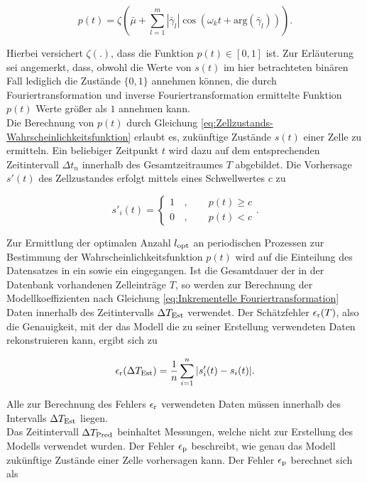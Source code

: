 \begin{equation}\label{eq:Zellzustands-Wahrscheinlichkeitsfunktion}
	p(t) = \zeta (\bar{\mu} + \sum_{l=1}^{m} |\bar{\gamma}_l| \cos(\omega_k t + \mathrm{arg}(\bar{\gamma}_l))) .
\end{equation}

Hierbei versichert $\zeta (.) $, dass die Funktion $p(t) \in [0, 1]$ ist. Zur Erläuterung sei angemerkt, dass, obwohl die Werte von $s(t)$ im hier betrachteten binären Fall lediglich die Zustände $\{0, 1\}$ annehmen können, die durch Fouriertransformation und inverse Fouriertransformation ermittelte Funktion $p(t)$ Werte größer als $1$ annehmen kann. \\
Die Berechnung von $p(t)$ durch Gleichung \ref{eq:Zellzustands-Wahrscheinlichkeitsfunktion} erlaubt es, zukünftige Zustände $s(t)$ einer Zelle zu ermitteln. Ein beliebiger Zeitpunkt $t$ wird dazu auf dem entsprechenden Zeitintervall $\Delta t_n$ innerhalb des Gesamtzeitraumes $T$ abgebildet. Die Vorhersage $s'(t)$ des Zellzustandes erfolgt mittels eines Schwellwertes $c$ zu

\begin{equation}\label{eq:Schwellwert-Verfahren}
	{s'}_i (t) = \begin{cases}
		1 & \, , \qquad p(t) \geq c \\
		0 & \, , \qquad p(t) < c 
	\end{cases} .
\end{equation}

Zur Ermittlung der optimalen Anzahl $l_{\mathrm{opt}}$ an periodischen Prozessen zur Bestimmung der Wahrscheinlichkeitsfunktion $p(t)$ wird auf die Einteilung des Datensatzes in ein \grqq{} sowie ein \grqq{} eingegangen. Ist die Gesamtdauer der in der Datenbank vorhandenen Zelleinträge $T$, so werden zur Berechnung der Modellkoeffizienten nach Gleichung \ref{eq:Inkrementelle Fouriertransformation} Daten innerhalb des Zeitintervalls $\Delta T_{\mathrm{Est}}$ verwendet. Der Schätzfehler $\epsilon_{\mathrm{r}} (T)$, also die Genauigkeit, mit der das Modell die zu seiner Erstellung verwendeten Daten rekonstruieren kann, ergibt sich zu

\begin{equation}\label{eq:Schätzfehler}
	\epsilon_{\mathrm{r}}(\Delta T_{\mathrm{Est}}) = \frac{1}{n} \sum_{i=1}^{n} |s_i '(t) - s_i (t)| .
\end{equation}

Alle zur Berechnung des Fehlers $\epsilon_{\mathrm{r}}$ verwendeten Daten müssen innerhalb des Intervalls $\Delta T_{\mathrm{Est}}$ liegen. \\
Das Zeitintervall $\Delta T_{\mathrm{Pred}}$ beinhaltet Messungen, welche nicht zur Erstellung des Modells verwendet wurden. Der Fehler $\epsilon_{\mathrm{p}}$ beschreibt, wie genau das Modell zukünftige Zustände einer Zelle vorhersagen kann. Der Fehler $\epsilon_{\mathrm{p}}$ berechnet sich als

